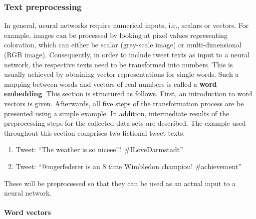\subsubsection{Text preprocessing}
\label{sub:text_preprocessing}

In general, neural networks require numerical inputs, i.e., scalars or vectors.
For example, images can be processed by looking at pixel values representing
coloration, which can either be scalar (grey-scale image) or multi-dimensional
(RGB image).
Consequently, in order to include tweet texts as input to a neural network,
the respective texts need to be transformed into numbers.
This is usually achieved by obtaining vector representations for single words.
Such a mapping between words and vectors of real numbers is called a \textbf{word
embedding}.
This section is structured as follows.
First, an introduction to word vectors is given.
Afterwards, all five steps of the transformation process are be presented using a simple example.
In addition, intermediate results of the preprocessing steps for the collected
data sets are described.
The example used throughout this section comprises two fictional tweet texts:

\begin{enumerate}
  \item Tweet: ``The weather is so niceee!!! \#ILoveDarmstadt''
  \item Tweet: ``@rogerfederer is an 8 time Wimbledon champion! \#achievement''
\end{enumerate}

These will be preprocessed so that they can be used as an actual input to a neural network.

\paragraph{Word vectors}
\label{sub:word_vectors}

